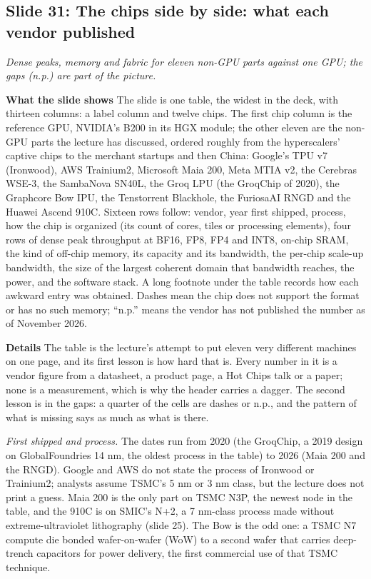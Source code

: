 \documentclass[11pt,letterpaper]{article}
\newcommand{\slide}[3]{%
  \subsection[Slide #1: #2]{Slide #1: #2}%
  {\color{muted}\itshape #3\par}\medskip}
\newcommand{\para}[1]{\medskip\noindent\textbf{#1}\quad}
\begin{document}
\slide{31}{The chips side by side: what each vendor published}{Dense peaks, memory and fabric for eleven non-GPU parts against one GPU; the gaps (n.p.) are part of the picture.}

\para{What the slide shows} The slide is one table, the widest in the deck, with thirteen columns: a label column and twelve chips. The first chip column is the reference GPU, NVIDIA's B200 in its HGX module; the other eleven are the non-GPU parts the lecture has discussed, ordered roughly from the hyperscalers' captive chips to the merchant startups and then China: Google's TPU v7 (Ironwood), AWS Trainium2, Microsoft Maia 200, Meta MTIA v2, the Cerebras WSE-3, the SambaNova SN40L, the Groq LPU (the GroqChip of 2020), the Graphcore Bow IPU, the Tenstorrent Blackhole, the FuriosaAI RNGD and the Huawei Ascend 910C. Sixteen rows follow: vendor, year first shipped, process, how the chip is organized (its count of cores, tiles or processing elements), four rows of dense peak throughput at BF16, FP8, FP4 and INT8, on-chip SRAM, the kind of off-chip memory, its capacity and its bandwidth, the per-chip scale-up bandwidth, the size of the largest coherent domain that bandwidth reaches, the power, and the software stack. A long footnote under the table records how each awkward entry was obtained. Dashes mean the chip does not support the format or has no such memory; ``n.p.'' means the vendor has not published the number as of November 2026.

\para{Details} The table is the lecture's attempt to put eleven very different machines on one page, and its first lesson is how hard that is. Every number in it is a vendor figure from a datasheet, a product page, a Hot Chips talk or a paper; none is a measurement, which is why the header carries a dagger. The second lesson is in the gaps: a quarter of the cells are dashes or n.p., and the pattern of what is missing says as much as what is there.

\emph{First shipped and process.} The dates run from 2020 (the GroqChip, a 2019 design on GlobalFoundries 14 nm, the oldest process in the table) to 2026 (Maia 200 and the RNGD). Google and AWS do not state the process of Ironwood or Trainium2; analysts assume TSMC's 5 nm or 3 nm class, but the lecture does not print a guess. Maia 200 is the only part on TSMC N3P, the newest node in the table, and the 910C is on SMIC's N+2, a 7 nm-class process made without extreme-ultraviolet lithography (slide 25). The Bow is the odd one: a TSMC N7 compute die bonded wafer-on-wafer (WoW) to a second wafer that carries deep-trench capacitors for power delivery, the first commercial use of that TSMC technique.
\end{document}
